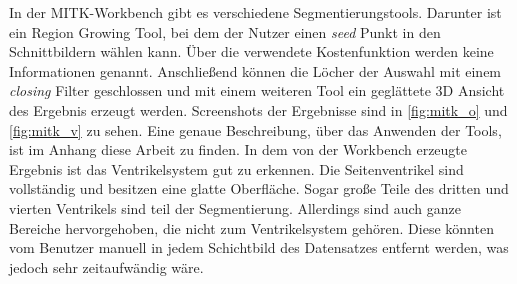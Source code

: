 In der MITK-Workbench gibt es verschiedene Segmentierungstools. Darunter ist ein Region Growing Tool, bei dem der Nutzer einen \textit{seed} Punkt in den Schnittbildern wählen kann. Über die verwendete Kostenfunktion werden keine Informationen genannt.
\newline
Anschließend können die Löcher der Auswahl mit einem \textit{closing} Filter geschlossen und mit einem weiteren Tool ein geglättete 3D Ansicht des Ergebnis erzeugt werden.
\newline
Screenshots der Ergebnisse sind in \autoref{fig:mitk_o} und \autoref{fig:mitk_v} zu sehen. Eine genaue Beschreibung, über das Anwenden der Tools, ist im Anhang diese Arbeit zu finden.
\newline
In dem von der Workbench erzeugte Ergebnis ist das Ventrikelsystem gut zu erkennen. Die Seitenventrikel sind vollständig und besitzen eine glatte Oberfläche. Sogar große Teile des dritten und vierten Ventrikels sind teil der Segmentierung.
\newline
Allerdings sind auch ganze Bereiche hervorgehoben, die nicht zum Ventrikelsystem gehören. Diese könnten vom Benutzer manuell in jedem Schichtbild des Datensatzes entfernt werden, was jedoch sehr zeitaufwändig wäre.


